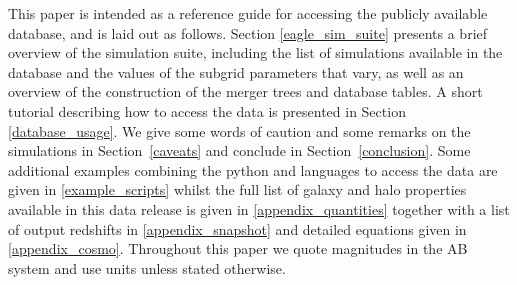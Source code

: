 This paper is intended as a reference guide for accessing the publicly available
\eagle database, and is laid out as follows. Section \ref{eagle_sim_suite}
presents a brief overview of the \eagle simulation suite, including the list of
simulations available in the database and the values of the subgrid parameters
that vary, as well as an overview of the construction of the merger trees and
database tables.  A short tutorial describing how to access the data is
presented in Section \ref{database_usage}. We give some words of caution and
some remarks on the simulations in Section~\ref{caveats} and conclude in
Section~\ref{conclusion}. Some additional examples combining the {\sc python}
and \sql languages to access the data are given in \ref{example_scripts} whilst
the full list of galaxy and halo properties available in this data release is
given in \ref{appendix_quantities} together with a list of output redshifts in
\ref{appendix_snapshot} and detailed equations given in \ref{appendix_cosmo}.
Throughout this paper we quote magnitudes in the AB system and use
 units unless stated otherwise.

